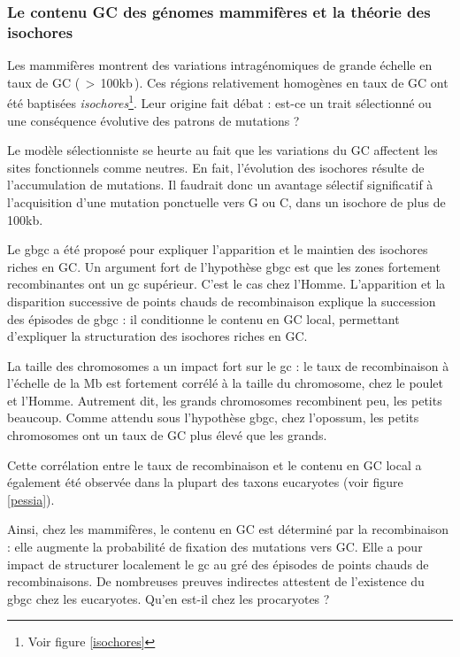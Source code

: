 \documentclass[11pt, oneside]{scrartcl}
\begin{document}
\subsubsection{Le contenu GC des génomes mammifères et la théorie des isochores}
\label{sec:orgheadline12}
Les mammifères montrent des variations intragénomiques de grande échelle en taux
de GC\cite{eyre-walker_evolution_2001} ( \(>\) 100kb ). Ces régions relativement
homogènes en taux de GC ont été baptisées \emph{isochores}\footnote{Voir figure
\ref{isochores}}. Leur origine fait débat : est-ce un trait sélectionné ou une
conséquence évolutive des patrons de mutations ?

Le modèle sélectionniste se heurte au fait que les variations du GC affectent
les sites fonctionnels comme neutres. En fait, l'évolution des isochores résulte
de l'accumulation de mutations. Il faudrait donc un avantage sélectif
significatif à l'acquisition d'une mutation ponctuelle vers G ou C, dans un
isochore de plus de 100kb.

Le \ac{gbgc} a été proposé pour expliquer l'apparition et le maintien des isochores
riches en GC\cite{duret_new_2006}. Un argument fort de l'hypothèse \ac{gbgc} est que
les zones fortement recombinantes ont un \ac{gc} supérieur. C'est le cas chez
l'Homme\cite{duret_impact_2008, berglund_hotspots_2009}. L'apparition et la
disparition successive de points chauds de recombinaison explique la succession
des épisodes de \ac{gbgc} : il conditionne le contenu en GC local, permettant
d'expliquer la structuration des isochores riches en GC. 

La taille des chromosomes a un impact fort sur le \ac{gc} : le taux de
recombinaison à l'échelle de la Mb est fortement corrélé à la taille du
chromosome, chez le poulet et l'Homme\cite{kaback_chromosome_1999}. Autrement
dit, les grands chromosomes recombinent peu, les petits beaucoup. Comme attendu
sous l'hypothèse \ac{gbgc}, chez l'opossum, les petits chromosomes ont un taux
de GC plus élevé que les grands.

Cette corrélation entre le taux de recombinaison et le contenu en GC local a
également été observée dans la plupart des taxons eucaryotes (voir figure
\ref{pessia}). 

\begin{transition}
  Ainsi, chez les mammifères, le contenu en GC est déterminé par la
  recombinaison : elle augmente la probabilité de fixation des mutations vers
  GC. Elle a pour impact de structurer localement le \ac{gc} au gré des épisodes
  de points chauds de recombinaisons. De nombreuses preuves indirectes attestent
  de l'existence du \ac{gbgc} chez les eucaryotes. Qu'en est-il chez les
  procaryotes ?
\end{transition}
\end{document}

